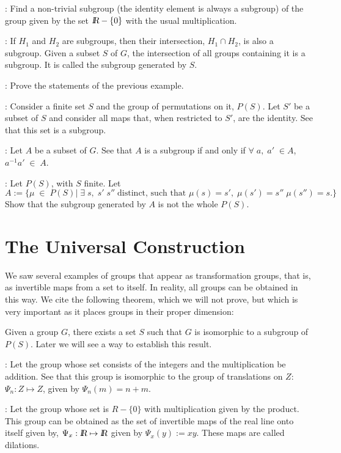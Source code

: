  \ejer: Find a non-trivial subgroup (the identity element is always a subgroup) of the group given by the set $\mbox{\sl {l$\!\!\!\;\:\!$R}} -\{0\}$ with the usual multiplication.
 
 \ejem: If $H_{1}$ and $H_{2}$ are subgroups, then their intersection, $H_{1} \cap H_{2}$, is also a subgroup.
 Given a subset $S$ of $G$, the intersection of all groups containing it is a subgroup. 
 It is called the subgroup generated by $S$. 
 
 \ejer: Prove the statements of the previous example.
 
 \ejer: Consider a finite set $S$ and the group of permutations on it, $P(S)$.  Let $S'$ be a subset of $S$ and consider all maps that, when restricted to $S'$, are the identity. 
 See that this set is a subgroup.
 
 \ejer: Let $A$ be a subset of $G$. See that $A$ is a subgroup if and only if $\forall \; a, \; a'\; \in A$, 
 $a^{-1}a' \; \in \; A$.
 
 \ejer: Let $P(S)$, with $S$ finite. Let 
 \[
 A := \{ \mu \;\in \; P(S) |\; \exists \;s, \; s' \; s''\; \mbox{distinct, such that } \mu(s) = s', \; \mu(s') =s'' \; \mu(s'') = s.\}\]
 Show that the subgroup generated by $A$ is not the whole $P(S)$.
 
 \section{The Universal Construction}
 
We saw several examples of groups that appear as transformation groups, that is, as invertible maps from a set to itself. In reality, all groups can be obtained in this way.
We cite the following theorem, which we will not prove, but which is very important as it places groups in their proper dimension:

\bteo
Given a group $G$, there exists a set $S$ such that $G$ is isomorphic to a subgroup of $P(S)$.
\eteo
% 
Later we will see a way to establish this result.

\ejem: Let the group whose set consists of the integers and the multiplication be addition. See that this group is isomorphic to the group of translations on $Z$: $\Psi_{n}: Z \mapsto Z$, given by 
$\Psi_{n}(m) = n+m$.

\ejem: 
Let the group whose set is $R-\{0\}$ with multiplication given by the product. This group can be obtained as the set of invertible maps of the real line onto itself given by, $\Psi_{x}: \re \mapsto \re$ given by $\Psi_{x}(y) := xy$. These maps are called dilations.

